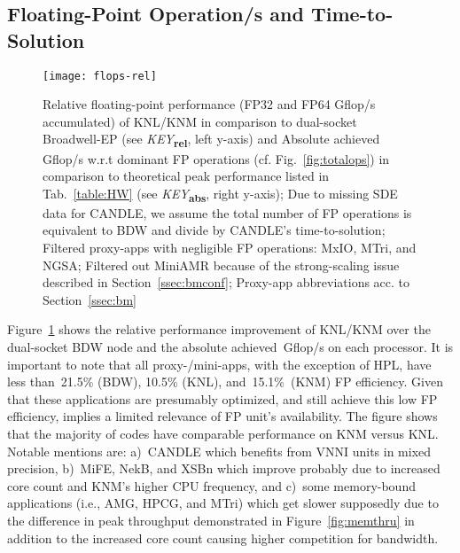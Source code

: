 \subsection{Floating-Point Operation/s and Time-to-Solution}\label{ssec:eval_flops}
%
\begin{figure}[tbp]
    \centering
    \texttt{[image: flops-rel]}
    \caption{\label{fig:flops} Relative floating-point performance (FP32 and FP64 \unit[]{Gflop/s} accumulated) of KNL/KNM in comparison to dual-socket Broadwell-EP (see \textit{KEY}\textbf{\textsubscript{rel}}, left y-axis) and Absolute achieved \unit[]{Gflop/s} w.r.t dominant FP operations (cf. Fig.~\ref{fig:totalops}) in comparison to theoretical peak performance listed in Tab.~\ref{table:HW} (see \textit{KEY}\textbf{\textsubscript{abs}}, right y-axis); Due to missing SDE data for CANDLE, we assume the total number of FP operations is equivalent to BDW and divide by CANDLE's time-to-solution; Filtered proxy-apps with negligible FP operations: MxIO, MTri, and NGSA; Filtered out MiniAMR because of the strong-scaling issue described in Section~\ref{ssec:bmconf}; Proxy-app abbreviations acc. to Section~\ref{ssec:bm}}
    \vspace{-0.6em}
\end{figure}
\begin{comment}
\begin{figure}[tbp]
    \centering
    \texttt{[image: t2s-rel]}
    \caption{\label{fig:t2s-knl-vs-knm} Speedup of KNM over KNL as baseline. MiniAMR included since the input is the same for both Phi\cJD{why call out MiniAMR?}; Proxy-app abbreviations acc. to Section~\ref{ssec:bm}}
\end{figure}
\end{comment}
%
Figure~\ref{fig:flops} shows the relative performance improvement of KNL/KNM over the dual-socket BDW node and the absolute achieved~\unit[]{Gflop/s} on each processor. It is important to note that all proxy-/mini-apps, with the exception of HPL, have less than~21.5\% (BDW), 10.5\% (KNL), and~15.1\%~(KNM) FP efficiency. Given that these applications are presumably optimized, and still achieve this low FP efficiency, implies a limited relevance of FP unit's availability. The figure shows that the majority of codes have comparable performance on KNM versus KNL. Notable mentions are: a)~CANDLE which benefits from VNNI units in mixed precision,
b)~MiFE, NekB, and XSBn which improve probably due to increased core count and KNM's higher CPU frequency,
and c)~some memory-bound applications (i.e., AMG, HPCG, and MTri) which get slower supposedly due to the difference in peak throughput demonstrated in Figure~\ref{fig:memthru} in addition to the increased core count causing higher competition for bandwidth. 

